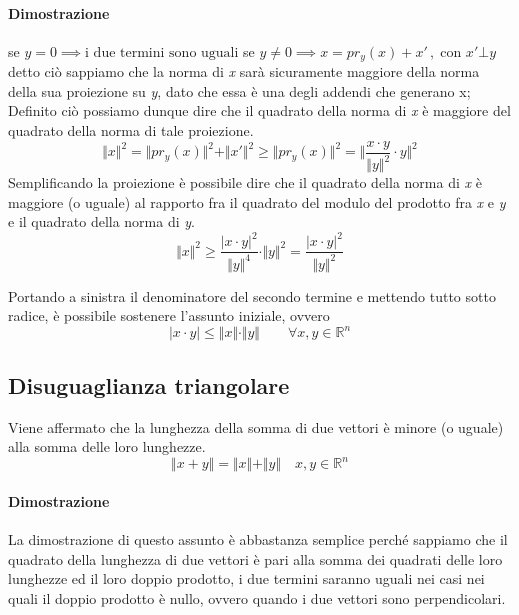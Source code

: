 				\begin{GrayBox}
					\paragraph{Dimostrazione} se $ y = 0 \implies \text{i due termini sono uguali} $ \newline
					se $ y \neq 0 \implies x = pr_y(x) + x' \, , \; \text{con } x' \bot y $ \newline
					detto ciò sappiamo che la norma di \textit{x} sarà sicuramente maggiore della norma della sua proiezione su \textit{y}, dato che essa è una degli addendi che generano x; Definito ciò possiamo dunque dire che il quadrato della norma di \textit{x} è maggiore del quadrato della norma di tale proiezione.
					$$ \Vert x \Vert^2 = \Vert pr_y(x) \Vert^2 + \Vert x' \Vert^2 \geq \Vert pr_y(x) \Vert^2 = \Vert \frac{x \cdot y}{\Vert y \Vert^2} \cdot y \Vert^2$$
					Semplificando la proiezione è possibile dire che il quadrato della norma di \textit{x} è maggiore (o uguale) al rapporto fra il quadrato del modulo del prodotto fra \textit{x} e \textit{y} e il quadrato della norma di \textit{y}.
					$$ \Vert x \Vert^2 \geq \frac{\vert x \cdot y \vert^2}{\Vert y \Vert^4} \cdot \Vert y \Vert^2 = \frac{\vert x \cdot y \vert^2}{\Vert y \Vert^2} $$
					
					Portando a sinistra il denominatore del secondo termine e mettendo tutto sotto radice, è possibile sostenere l'assunto iniziale, ovvero
					$$ \vert x \cdot y \vert \leq \Vert x \Vert \cdot \Vert y \Vert \qquad \forall x, y \in \mathbb{R}^n $$
				\end{GrayBox}
			
			\subsection{Disuguaglianza triangolare}
				Viene affermato che la lunghezza della somma di due vettori è minore (o uguale) alla somma delle loro lunghezze.
				$$ \Vert x + y \Vert = \Vert x \Vert + \Vert y \Vert \quad x, y \in \mathbb{R}^n $$
				\begin{GrayBox}
					\paragraph{Dimostrazione} La dimostrazione di questo assunto è abbastanza semplice perché sappiamo che il quadrato della lunghezza di due vettori è pari alla somma dei quadrati delle loro lunghezze ed il loro doppio prodotto, i due termini saranno uguali nei casi nei quali il doppio prodotto è nullo, ovvero quando i due vettori sono perpendicolari.
				\end{GrayBox}
				
